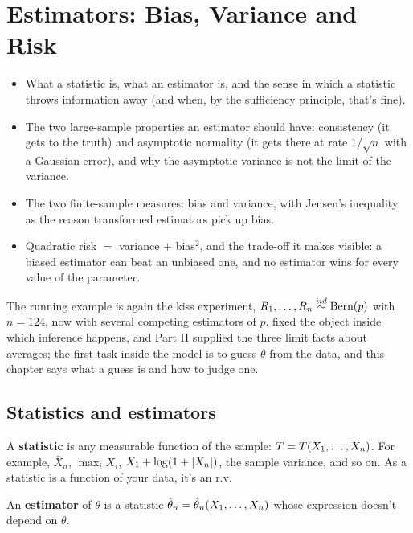 \chapter{Estimators: Bias, Variance and Risk}
\label{ch:estimators}

\begin{chaptergoals}
\begin{itemize}[nosep]
\item What a statistic is, what an estimator is, and the sense in which a statistic throws information away (and when, by the sufficiency principle, that's fine).
\item The two large-sample properties an estimator should have: consistency (it gets to the truth) and asymptotic normality (it gets there at rate $1/\sqrt{n}$ with a Gaussian error), and why the asymptotic variance is not the limit of the variance.
\item The two finite-sample measures: bias and variance, with Jensen's inequality as the reason transformed estimators pick up bias.
\item Quadratic risk $=$ variance $+$ bias$^2$, and the trade-off it makes visible: a biased estimator can beat an unbiased one, and no estimator wins for every value of the parameter.
\end{itemize}
The running example is again the kiss experiment, $R_1, \ldots, R_n \stackrel{iid}{\sim} \text{Bern}(p)$ with $n = 124$, now with several competing estimators of $p$.
 fixed the object inside which inference happens, and Part II supplied the three limit facts about averages; the first task inside the model is to guess $\theta$ from the data, and this chapter says what a guess is and how to judge one.
\end{chaptergoals}

\section{Statistics and estimators}
\label{sec:est-statistics}

\begin{definition}
\label{def:estimator}
A \textbf{statistic} is any measurable function of the sample: $T = T(X_1, \ldots, X_n)$.
For example, $\bar{X}_n$, $\max_i X_i$, $X_1 + \log(1 + \lvert X_n\rvert)$, the sample variance, and so on.
As a statistic is a function of your data, it's an r.v.

An \textbf{estimator} of $\theta$ is a statistic $\hat{\theta}_n = \hat{\theta}_n(X_1, \ldots, X_n)$ whose expression doesn't depend on $\theta$.
\end{definition}


